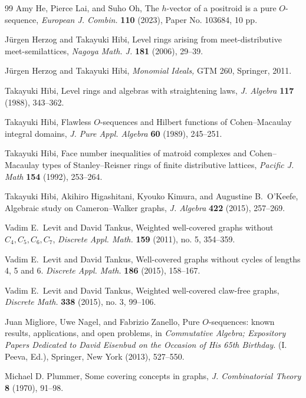 \documentclass[12pt]{amsart}
\numberwithin{equation}{section}
\theoremstyle{definition}
\newcounter{i} %
\begin{document}
\begin{thebibliography}{99}
 Amy He, Pierce Lai, and Suho Oh, 
The $h$-vector of a positroid is a pure $O$-sequence, 
{\it European J. Combin.} \textbf{110} (2023), Paper No. 103684, 10 pp.

J\"urgen Herzog and Takayuki Hibi,
Level rings arising from meet-distributive meet-semilattices,
{\it Nagoya Math. J.} {\bf 181} (2006), 29--39.

J\"urgen Herzog and Takayuki Hibi, 
{\it Monomial Ideals,} 
GTM 260, Springer, 2011.

Takayuki Hibi, 
Level rings and algebras with straightening laws, 
{\it J. Algebra} {\bf 117} (1988), 343--362.

Takayuki Hibi, 
Flawless $O$-sequences and Hilbert functions of Cohen--Macaulay integral domains, 
{\it J. Pure Appl. Algebra} {\bf 60} (1989), 245--251.

Takayuki Hibi, 
Face number inequalities of matroid complexes and Cohen--Macaulay types of Stanley--Reisner rings of finite distributive lattices, 
{\it Pacific J. Math} {\bf 154} (1992), 253--264.

Takayuki Hibi, Akihiro Higashitani, Kyouko Kimura, and Augustine B.~O'Keefe,
Algebraic study on Cameron–Walker graphs, 
{\it J. Algebra} {\bf 422} (2015), 257--269.

Vadim E.~Levit and David Tankus, 
Weighted well-covered graphs without $C_4,C_5,C_6,C_7$,
{\it Discrete Appl. Math.} {\bf 159} (2011), no. 5, 354--359.

Vadim E.~Levit and David Tankus,
Well-covered graphs without cycles of lengths 4, 5 and 6.
{\it Discrete Appl. Math.} {\bf 186} (2015), 158--167.

Vadim E.~Levit and David Tankus,  
Weighted well-covered claw-free graphs,
{\it Discrete Math.}  {\bf 338} (2015), no. 3, 99--106.

 Juan Migliore,  Uwe Nagel, and Fabrizio Zanello, 
Pure $O$-sequences: known results, applications, and open problems, 
in {\it Commutative Algebra;  Expository Papers Dedicated to David Eisenbud on the Occasion of His 65th Birthday}. (I. Peeva, Ed.), Springer, New York (2013), 527--550.


Michael D. Plummer, 
Some covering concepts in graphs,
{\it J. Combinatorial Theory} {\bf 8} (1970), 91--98.


\end{thebibliography}
\end{document}
